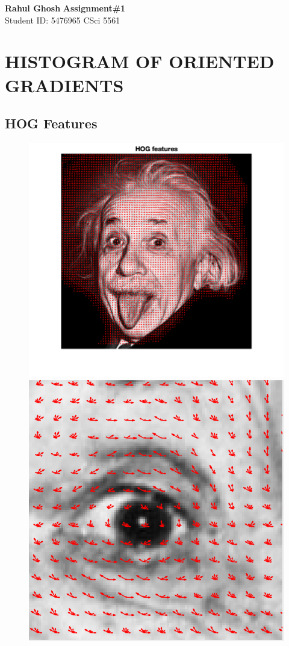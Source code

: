\documentclass[letter, 11pt]{article}
\begin{document}
\noindent
\large \textbf{Rahul Ghosh} \hfill \textbf{Assignment\#1}\\
\normalsize Student ID: 5476965 \hfill CSci 5561\\

\section*{HISTOGRAM OF ORIENTED GRADIENTS}

\subsection*{HOG Features}
\begin{figure}[!htb]
  \includegraphics[width=\linewidth]{HW1/RESULT/HOG.png}
  \label{fig:HOG IMAGE}
\endminipage
{}
  \includegraphics[width=\linewidth]{HW1/RESULT/HOG_EYE.png}

\end{figure}
\end{document}
